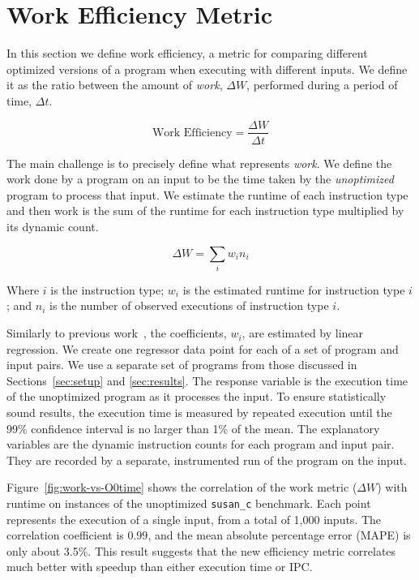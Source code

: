 \section{Work Efficiency Metric} \label{sec:metric}

    In this section we define work efficiency, a metric for comparing different optimized versions of a program when executing with
    different inputs. We define it as the ratio between the amount of \textit{work}, $\Delta W$, performed during a period of time, $\Delta
    t$.

    \[
       \textrm{Work Efficiency} = \frac{\Delta W}{\Delta t}
    \]

    The main challenge is to precisely define what represents \textit{work}. We define the work done by a program on an input to be the
    time taken by the \emph{unoptimized} program to process that input. We estimate the runtime of each instruction type and then work is the sum
    of the runtime for each instruction type multiplied by its dynamic count.

    \[ \Delta W = \sum_i w_i n_i \]

    Where $i$ is the instruction type; $w_i$ is the estimated runtime for instruction type $i$; and $n_i$ is the number of observed
    executions of instruction type $i$.

    Similarly to previous work~\citep{giusto01,powell09,brandolese11}, the coefficients, $w_i$, are estimated by linear regression. We
    create one regressor data point for each of a set of program and input pairs. We use a separate set of programs from those discussed in
    Sections~\ref{sec:setup} and \ref{sec:results}.
    The response variable is the execution time of the unoptimized program as it processes the input. To ensure statistically sound
    results, the execution time is measured by repeated execution until the 99\% confidence interval is no larger than 1\% of the mean. The
    explanatory variables are the dynamic instruction counts for each program and input pair. They are recorded by a separate, instrumented
    run of the program on the input.

    Figure~\ref{fig:work-vs-O0time} shows the correlation of the work metric ($\Delta W$) with runtime on instances of the unoptimized
    \texttt{susan\_c} benchmark. Each point represents the execution of a single input, from a total of 1,000 inputs. The correlation
    coefficient is $0.99$, and the mean absolute percentage error (MAPE) is only about 3.5\%. This result suggests that the new efficiency
    metric correlates much better with speedup than either execution time or IPC.

